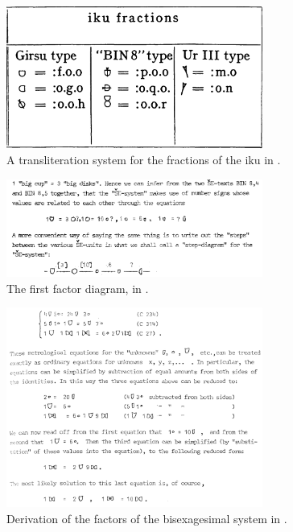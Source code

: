 \documentclass[10pt, a4paper, twoside]{article}
\begin{document}
\begin{figure}[H]
  \begin{center}
  \includegraphics[width=0.75\textwidth]{powell-216.png}
  \caption{A transliteration system for the fractions of the iku in \cite[216]{Powell1972}.}
  \end{center}
\end{figure}
\begin{figure}[H]
  \begin{center}
  \includegraphics[width=0.75\textwidth]{friberg-10.png}
  \caption[]{The first factor diagram, in \cite[10]{Friberg1978}.\label{firstStepDiagram}}
  \end{center}
\end{figure}
\begin{figure}[H]
  \begin{center}
  \includegraphics[width=0.75\textwidth]{friberg-15.png}
  \caption[]{Derivation of the factors of the bisexagesimal system in \cite[15]{Friberg1978}\label{FribergEquations}\footnotemark.}
  \end{center}
\end{figure}
\end{document}
